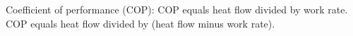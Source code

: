 Coefficient of performance (COP):  
COP equals heat flow divided by work rate.  
COP equals heat flow divided by (heat flow minus work rate).